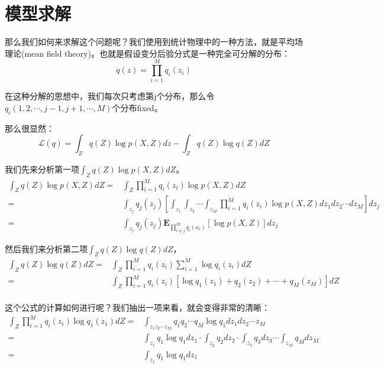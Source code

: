 \documentclass[a4paper]{article}
\begin{document}
\section{模型求解}
那么我们如何来求解这个问题呢？我们使用到统计物理中的一种方法，就是平均场理论(mean field theory)。也就是假设变分后验分式是一种完全可分解的分布：
\begin{equation}
    q(z) = \prod_{i=1}^M q_i(z_i)
\end{equation}

在这种分解的思想中，我们每次只考虑第j个分布，那么令$q_i(1,2,\cdots,j-1,j+1,\cdots,M)$个分布fixed。

那么很显然：
\begin{equation}
    \mathcal{L}(q) = \int_Zq(Z)\log p(X,Z)dz - \int_Zq(Z)\log q(Z)dZ
\end{equation}

我们先来分析第一项$ \int_Zq(Z)\log p(X,Z)dZ$。
\begin{equation}
    \begin{split}
        \int_Zq(Z)\log p(X,Z)dZ 
        = & \int_Z\prod_{i=1}^M q_i(z_i)\log p(X,Z)dZ \\
        = & \int_{z_j}q_j(z_j) \left[\int_{z_1}\int_{z_2}\cdots\int_{z_M} \prod_{i=1}^M q_i(z_i)\log p(X,Z)dz_1dz_2\cdots dz_M \right] dz_j \\
        = & \int_{z_j}q_j(z_j) \mathbf{E}_{\prod_{i \neq j}^Mq_i(x_i)}\left[ \log p(X,Z) \right] dz_j
    \end{split}
\end{equation}

然后我们来分析第二项$\int_Zq(Z)\log q(Z)dZ$，
\begin{equation}
    \begin{split}
        \int_Zq(Z)\log q(Z)dZ 
        = & \int_Z \prod_{i=1}^M q_i(z_i) \sum_{i=1}^M \log q_i(z_i)dZ \\
        = & \int_Z \prod_{i=1}^M q_i(z_i) \left[ \log q_1(z_1) + q_2(z_2) + \cdots + q_M(z_M)\right] dZ \\
    \end{split}
\end{equation}

这个公式的计算如何进行呢？我们抽出一项来看，就会变得非常的清晰：
\begin{equation}
    \begin{split}
        \int_Z \prod_{i=1}^M q_i(z_i) \log q_1(z_1) dZ
        = &  \int_{z_1z_2\cdots z_M} q_1q_2\cdots q_M \log q_1 dz_1dz_2 \cdots z_M \\
        = & \int_{z_1}q_1\log q_1 dz_1 \cdot \int_{z_2}q_2dz_2 \cdot \int_{z_3}q_3dz_3 \cdots \int_{z_M}q_Mdz_M \\
        = & \int_{z_1}q_1\log q_1 dz_1
    \end{split}
\end{equation}
\end{document}
